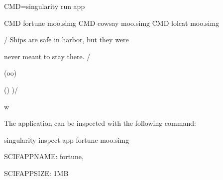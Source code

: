\documentclass[letterpaper,10pt,english]{sphinxmanual}
\begin{document}
%
\begin{sphinxVerbatim}[commandchars=\\\{\}]
CMD=\PYGZdq{}singularity run \PYGZhy{}\PYGZhy{}app\PYGZdq{}

\PYGZdl{}CMD fortune moo.simg \textbar{} \PYGZdl{}CMD cowsay moo.simg \textbar{} \PYGZdl{}CMD lolcat moo.simg

 \PYGZus{}\PYGZus{}\PYGZus{}\PYGZus{}\PYGZus{}\PYGZus{}\PYGZus{}\PYGZus{}\PYGZus{}\PYGZus{}\PYGZus{}\PYGZus{}\PYGZus{}\PYGZus{}\PYGZus{}\PYGZus{}\PYGZus{}\PYGZus{}\PYGZus{}\PYGZus{}\PYGZus{}\PYGZus{}\PYGZus{}\PYGZus{}\PYGZus{}\PYGZus{}\PYGZus{}\PYGZus{}\PYGZus{}\PYGZus{}\PYGZus{}\PYGZus{}\PYGZus{}\PYGZus{}\PYGZus{}\PYGZus{}\PYGZus{}\PYGZus{}\PYGZus{}\PYGZus{}\PYGZus{}

/ Ships are safe in harbor, but they were \PYGZbs{}

\PYGZbs{} never meant to stay there.              /

 \PYGZhy{}\PYGZhy{}\PYGZhy{}\PYGZhy{}\PYGZhy{}\PYGZhy{}\PYGZhy{}\PYGZhy{}\PYGZhy{}\PYGZhy{}\PYGZhy{}\PYGZhy{}\PYGZhy{}\PYGZhy{}\PYGZhy{}\PYGZhy{}\PYGZhy{}\PYGZhy{}\PYGZhy{}\PYGZhy{}\PYGZhy{}\PYGZhy{}\PYGZhy{}\PYGZhy{}\PYGZhy{}\PYGZhy{}\PYGZhy{}\PYGZhy{}\PYGZhy{}\PYGZhy{}\PYGZhy{}\PYGZhy{}\PYGZhy{}\PYGZhy{}\PYGZhy{}\PYGZhy{}\PYGZhy{}\PYGZhy{}\PYGZhy{}\PYGZhy{}\PYGZhy{}

        \PYGZbs{}   \PYGZca{}\PYGZus{}\PYGZus{}\PYGZca{}

         \PYGZbs{}  (oo)\PYGZbs{}\PYGZus{}\PYGZus{}\PYGZus{}\PYGZus{}\PYGZus{}\PYGZus{}\PYGZus{}

            (\PYGZus{}\PYGZus{})\PYGZbs{}       )\PYGZbs{}/\PYGZbs{}

                \textbar{}\textbar{}\PYGZhy{}\PYGZhy{}\PYGZhy{}\PYGZhy{}w \textbar{}

                \textbar{}\textbar{}     \textbar{}\textbar{}
\end{sphinxVerbatim}

The application can be inspected with the following command:

%
\begin{sphinxVerbatim}[commandchars=\\\{\}]
singularity inspect \PYGZhy{}\PYGZhy{}app fortune moo.simg

\PYGZob{}

    \PYGZdq{}SCIF\PYGZus{}APP\PYGZus{}NAME\PYGZdq{}: \PYGZdq{}fortune\PYGZdq{},

    \PYGZdq{}SCIF\PYGZus{}APP\PYGZus{}SIZE\PYGZdq{}: \PYGZdq{}1MB\PYGZdq{}

\PYGZcb{}
\end{sphinxVerbatim}
\end{document}
